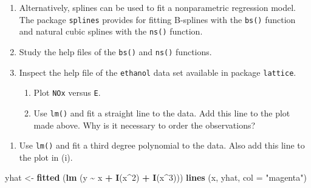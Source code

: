 \documentclass[
]{book}
\newenvironment{Shaded}{\begin{snugshade}}{\end{snugshade}}
\newcommand{\AttributeTok}[1]{\textcolor[rgb]{0.13,0.29,0.53}{#1}}
\newcommand{\DecValTok}[1]{\textcolor[rgb]{0.00,0.00,0.81}{#1}}
\newcommand{\FunctionTok}[1]{\textcolor[rgb]{0.13,0.29,0.53}{\textbf{#1}}}
\newcommand{\NormalTok}[1]{#1}
\newcommand{\OtherTok}[1]{\textcolor[rgb]{0.56,0.35,0.01}{#1}}
\newcommand{\SpecialCharTok}[1]{\textcolor[rgb]{0.81,0.36,0.00}{\textbf{#1}}}
\newcommand{\StringTok}[1]{\textcolor[rgb]{0.31,0.60,0.02}{#1}}
\providecommand{\tightlist}{%
  \setlength{\itemsep}{0pt}\setlength{\parskip}{0pt}}
\begin{document}
\begin{enumerate}
\def\labelenumi{(\alph{enumi})}
\setcounter{enumi}{4}
\item
  Alternatively, splines can be used to fit a nonparametric regression model. The package \texttt{splines} provides for fitting B-splines with the \texttt{bs()} function and natural cubic splines with the \texttt{ns()} function.
\item
  Study the help files of the \texttt{bs()} and \texttt{ns()} functions.
\item
  Inspect the help file of the \texttt{ethanol} data set available in package \texttt{lattice}.

  \begin{enumerate}
  \def\labelenumii{(\roman{enumii})}
  \item
    Plot \texttt{NOx} versus \texttt{E}.
  \item
    Use \texttt{lm()} and fit a straight line to the data. Add this line to the plot made above. Why is it necessary to order the observations?
  \end{enumerate}
\end{enumerate}

\begin{Shaded}
\end{Shaded}

\begin{enumerate}
\def\labelenumi{(\roman{enumi})}
\setcounter{enumi}{2}
\tightlist
\item
  Use \texttt{lm()} and fit a third degree polynomial to the data. Also add this line to the plot in (i).
\end{enumerate}

\begin{Shaded}
\begin{Highlighting}[]
\NormalTok{yhat }\OtherTok{\textless{}{-}} \FunctionTok{fitted}\NormalTok{ (}\FunctionTok{lm}\NormalTok{ (y }\SpecialCharTok{\textasciitilde{}}\NormalTok{ x }\SpecialCharTok{+} \FunctionTok{I}\NormalTok{(x}\SpecialCharTok{\^{}}\DecValTok{2}\NormalTok{) }\SpecialCharTok{+} \FunctionTok{I}\NormalTok{(x}\SpecialCharTok{\^{}}\DecValTok{3}\NormalTok{)))}
\FunctionTok{lines}\NormalTok{ (x, yhat, }\AttributeTok{col =} \StringTok{"magenta"}\NormalTok{)}
\end{Highlighting}
\end{Shaded}
\end{document}
